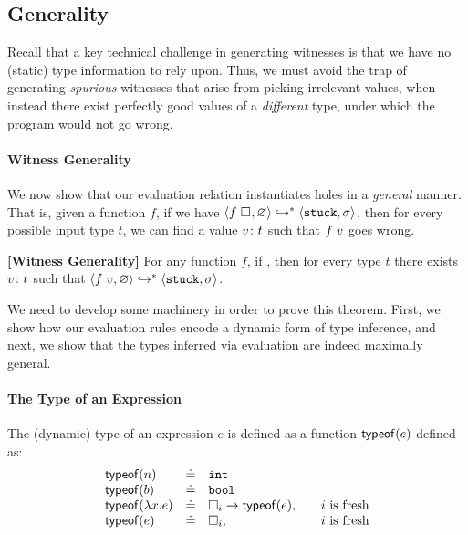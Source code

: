 
%
\subsection{Generality}\label{sec:soundness}

Recall that a key technical challenge in generating witnesses is
that we have no (static) type information to rely upon. Thus, we
must avoid the trap of generating \emph{spurious} witnesses that
arise from picking irrelevant values, when instead there exist
perfectly good values of a \emph{different} type, under which
the program would not go wrong.

\paragraph{Witness Generality}
We now show that our evaluation relation instantiates holes in a
\emph{general} manner. That is, given a function $f$, if we have
$\langle f \ \square_{}, \varnothing \rangle \hookrightarrow^{*} \langle \mathtt{stuck}, \sigma \rangle$, then for every
possible input type $t$, we can find a value ${v} \colon {t}$
such that $f \ v$ goes wrong.

\begin{thm}{\textbf{[Witness Generality]}}
\label{thm:soundness}
  For any function $f$, if ,
  then for every type $t$ there exists ${v} \colon {t}$ such that
  $\langle f \ v, \varnothing \rangle \hookrightarrow^{*} \langle \mathtt{stuck}, \sigma \rangle$.
\end{thm}

We need to develop some machinery in order to prove this theorem.
First, we show how our evaluation rules encode a dynamic form of
type inference, and next, we show that the types inferred via
evaluation are indeed maximally general.

\paragraph{The Type of an Expression} The (dynamic) type of an
expression $e$ is defined as a function $\mathsf{typeof}(e)$ defined as:
  \[
  \begin{array}{lcll}
    \mathsf{typeof}(n)   & \doteq & \mathtt{int} & \\
    \mathsf{typeof}(b)   & \doteq & \mathtt{bool} & \\
    \mathsf{typeof}(\lambda x. e) & \doteq & {\square_{i}} \rightarrow \mathsf{typeof}(e), & \quad \text{$i$ is fresh} \\
    \mathsf{typeof}(e) & \doteq & \square_{i}, & \quad \text{$i$ is fresh} \\
  \end{array}
  \]

